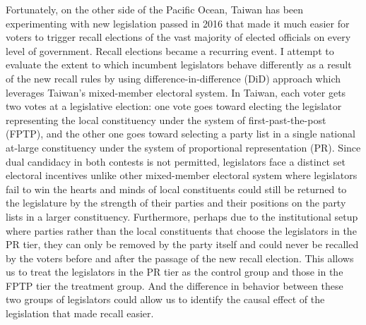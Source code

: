 \documentclass[crop=false]{standalone}
\begin{document}
	Fortunately, on the other side of the Pacific Ocean, Taiwan has been experimenting with new legislation passed in 2016 that made it much easier for voters to trigger recall elections of the vast majority of elected officials on every level of government. Recall elections became a recurring event. I attempt to evaluate the extent to which incumbent legislators behave differently as a result of the new recall rules by using difference-in-difference (DiD) approach which leverages Taiwan's mixed-member electoral system. In Taiwan, each voter gets two votes at a legislative election: one vote goes toward electing the legislator representing the local constituency under the system of first-past-the-post (FPTP), and the other one goes toward selecting a party list in a single national at-large constituency under the system of proportional representation (PR). Since dual candidacy in both contests is not permitted, legislators face a distinct set electoral incentives unlike other mixed-member electoral system where legislators fail to win the hearts and minds of local constituents could still be returned to the legislature by the strength of their parties and their positions on the party lists in a larger constituency. Furthermore, perhaps due to the institutional setup where parties rather than the local constituents that choose the legislators in the PR tier, they can only be removed by the party itself and could never be recalled by the voters before and after the passage of the new recall election. This allows us to treat the legislators in the PR tier as the control group and those in the FPTP tier the treatment group. And the difference in behavior between these two groups of legislators could allow us to identify the causal effect of the legislation that made recall easier.
	
	
	
\end{document}
